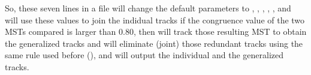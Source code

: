 So, these seven lines in a file will change the default parameters to 
,
,
,
,
,
and will use these values to join the indidual tracks if the congruence value of the two MSTs compared is larger than  0.80, then \MT  will track those resulting MST to obtain the generalized tracks and will eliminate (joint) those redundant tracks using the same rule used before (), and will output the individual and the generalized tracks.   
